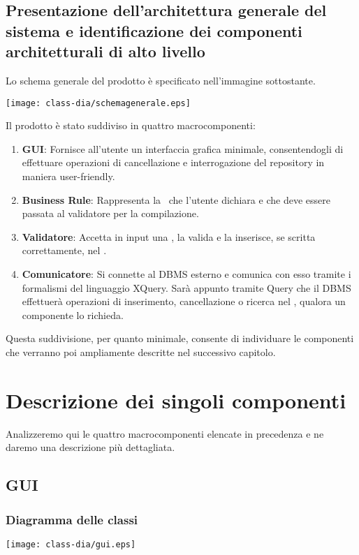 \section [Architettura generale del sistema]{Presentazione dell'architettura generale del sistema e identificazione dei componenti architetturali di alto livello}
Lo schema generale del prodotto \`e specificato nell'immagine sottostante.
\begin{center}
\texttt{[image: class-dia/schemagenerale.eps]}
\end{center}
Il prodotto \`e stato suddiviso in quattro macrocomponenti:
\begin{enumerate}
 \item \textbf{GUI}: Fornisce all'utente un interfaccia grafica minimale, consentendogli di effettuare operazioni di cancellazione e interrogazione del repository in maniera user-friendly.
\item \textbf{Business Rule}: Rappresenta la \br\ che l'utente dichiara e che deve essere passata al validatore per la compilazione.
\item \textbf{Validatore}: Accetta in input una \br, la valida e la inserisce, se scritta correttamente, nel \rp.
\item \textbf{Comunicatore}: Si connette al DBMS esterno e comunica con esso tramite i formalismi del linguaggio XQuery.
Sar\`a appunto tramite Query che il DBMS effettuer\`a operazioni di inserimento, cancellazione o ricerca nel \rp, qualora un componente lo richieda.
\end{enumerate}
Questa suddivisione, per quanto minimale, consente di individuare le componenti che verranno poi ampliamente descritte nel successivo capitolo.

\chapter{Descrizione dei singoli componenti}
Analizzeremo qui le quattro macrocomponenti elencate in precedenza e ne daremo una descrizione pi\`u dettagliata.

\section{GUI}
\subsection{Diagramma delle classi}
\begin{center}
\texttt{[image: class-dia/gui.eps]}
\end{center}
